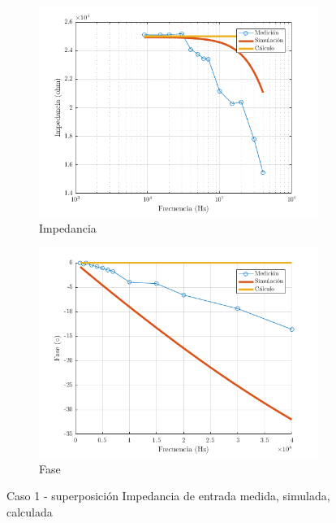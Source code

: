 \documentclass[../../main.tex]{subfiles}
\begin{document}
\begin{figure}[H]
\centering
\begin{subfigure}[http]{0.49\textwidth}
\includegraphics[width=\textwidth]{imagenes/z_n_r_c1.png}
\caption{Impedancia}\label{fig=znZc1}
\end{subfigure}
\begin{subfigure}[http]{0.49\textwidth}
\includegraphics[width=\textwidth]{imagenes/z_n_f_c1.png}
\caption{Fase} \label{fig=znFc1}
\end{subfigure}
\caption{Caso 1 - superposición Impedancia de entrada  medida, simulada, calculada}
\end{figure}
\end{document}
